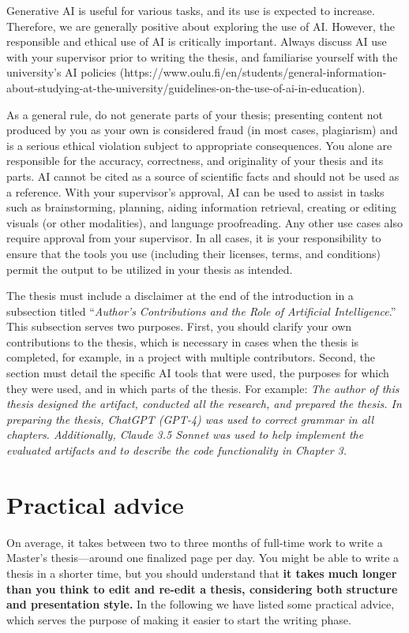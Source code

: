 Generative AI is useful for various tasks, and its use is expected to
increase. Therefore, we are generally positive about exploring the
use of AI. However, the responsible and ethical use of AI is
critically important. Always discuss AI use with your supervisor
prior to writing the thesis, and familiarise yourself with the
university's AI policies
(https://www.oulu.fi/en/students/general-information-about-studying-at-the-university/guidelines-on-the-use-of-ai-in-education).

As a general rule, do not generate parts of your thesis; presenting
content not produced by you as your own is considered fraud (in most
cases, plagiarism) and is a serious ethical violation subject to
appropriate consequences. You alone are responsible for the accuracy,
correctness, and originality of your thesis and its parts. AI cannot
be cited as a source of scientific facts and should not be used as a
reference. With your supervisor's approval, AI can be used to assist
in tasks such as brainstorming, planning, aiding information
retrieval, creating or editing visuals (or other modalities), and
language proofreading. Any other use cases also require approval from
your supervisor. In all cases, it is your responsibility to ensure
that the tools you use (including their licenses, terms, and
conditions) permit the output to be utilized in your thesis as intended.

The thesis must include a disclaimer at the end of the introduction
in a subsection titled ``\textit{Author's Contributions and the Role
of Artificial Intelligence}.'' This subsection serves two purposes.
First, you should clarify your own contributions to the thesis, which
is necessary in cases when the thesis is completed, for example, in a
project with multiple contributors. Second, the section must detail
the specific AI tools that were used, the purposes for which they
were used, and in which parts of the thesis. For example: \textit{The
author of this thesis designed the artifact, conducted all the
research, and prepared the thesis. In preparing the thesis, ChatGPT
(GPT-4) was used to correct grammar in all chapters. Additionally,
Claude 3.5 Sonnet was used to help implement the evaluated artifacts
and to describe the code functionality in Chapter 3.}

\section{Practical advice}

On average, it takes between two to three months of full-time work to
write a Master’s thesis---around one finalized page per day. You
might be able to write a thesis in a shorter time, but you should
understand that \textbf{it takes much longer than you think to edit
and re-edit a thesis, considering both structure and presentation
style.} In the following we have listed some practical advice, which
serves the purpose of making it easier to start the writing phase.

